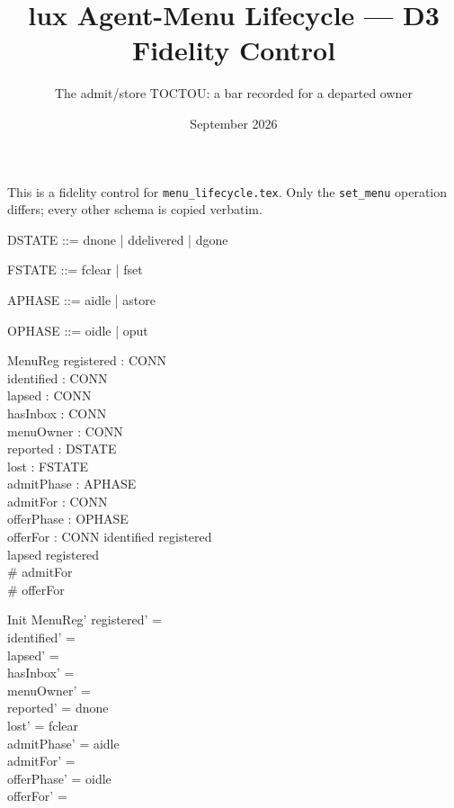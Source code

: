 \documentclass[a4paper,10pt,fleqn]{article}
\begin{document}
\title{lux Agent-Menu Lifecycle --- D3 Fidelity Control}
\author{The admit/store TOCTOU: a bar recorded for a departed owner}
\date{September 2026}
\maketitle

This is a fidelity control for \texttt{menu\_lifecycle.tex}. Only the
\texttt{set\_menu} operation differs; every other schema is copied verbatim.

\begin{zed}
  [CONN]
\end{zed}

\begin{zed}
  DSTATE ::= dnone | ddelivered | dgone
\end{zed}

\begin{zed}
  FSTATE ::= fclear | fset
\end{zed}

\begin{zed}
  APHASE ::= aidle | astore
\end{zed}

\begin{zed}
  OPHASE ::= oidle | oput
\end{zed}

\begin{schema}{MenuReg}
  registered : \power CONN \\
  identified : \power CONN \\
  lapsed : \power CONN \\
  hasInbox : \power CONN \\
  menuOwner : \power CONN \\
  reported : DSTATE \\
  lost : FSTATE \\
  admitPhase : APHASE \\
  admitFor : \power CONN \\
  offerPhase : OPHASE \\
  offerFor : \power CONN
\where
  identified \subseteq registered \\
  lapsed \subseteq registered \\
  \# admitFor  \\
  \# offerFor 
\end{schema}

\begin{schema}{Init}
  MenuReg'
\where
  registered' = \emptyset \\
  identified' = \emptyset \\
  lapsed' = \emptyset \\
  hasInbox' = \emptyset \\
  menuOwner' = \emptyset \\
  reported' = dnone \\
  lost' = fclear \\
  admitPhase' = aidle \\
  admitFor' = \emptyset \\
  offerPhase' = oidle \\
  offerFor' = \emptyset
\end{schema}
\end{document}
